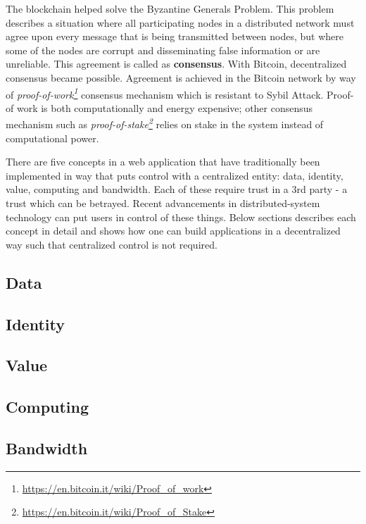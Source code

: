 	The blockchain helped solve the Byzantine Generals Problem\cite{lamport1982byzantine}. This problem describes a situation where all participating nodes in a distributed network must agree upon every message that is being transmitted between nodes, but where some of the nodes are corrupt and disseminating false information or are unreliable. This agreement is called as \textbf{consensus}. With Bitcoin\cite{nakamoto2008bitcoin}, decentralized consensus became possible. Agreement is achieved in the Bitcoin network by way of \textit{proof-of-work\footnote{\url{https://en.bitcoin.it/wiki/Proof_of_work}}} consensus mechanism which is resistant to Sybil Attack\cite{douceur2002sybil}. Proof-of work is both computationally and energy expensive; other consensus mechanism such as \textit{proof-of-stake\footnote{\url{https://en.bitcoin.it/wiki/Proof_of_Stake}}} relies on stake in the system instead of computational power.
	
	There are five concepts in a web application that have traditionally been implemented in way that puts control with a centralized entity: data, identity, value, computing and bandwidth. Each of these require trust in a 3rd party - a trust which can be betrayed. Recent advancements in distributed-system technology can put users in control of these things. Below sections describes each concept in detail and shows how one can build applications in a decentralized way such that centralized control is not required.

	\subsection{Data}
	
	\subsection{Identity}
	
	\subsection{Value}
	
	\subsection{Computing}
	
	\subsection{Bandwidth}